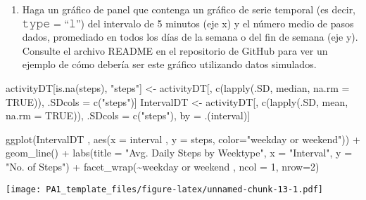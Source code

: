 \documentclass[
]{article}
\newenvironment{Shaded}{\begin{snugshade}}{\end{snugshade}}
\newcommand{\AttributeTok}[1]{\textcolor[rgb]{0.77,0.63,0.00}{#1}}
\newcommand{\ConstantTok}[1]{\textcolor[rgb]{0.00,0.00,0.00}{#1}}
\newcommand{\DecValTok}[1]{\textcolor[rgb]{0.00,0.00,0.81}{#1}}
\newcommand{\FunctionTok}[1]{\textcolor[rgb]{0.00,0.00,0.00}{#1}}
\newcommand{\NormalTok}[1]{#1}
\newcommand{\OtherTok}[1]{\textcolor[rgb]{0.56,0.35,0.01}{#1}}
\newcommand{\SpecialCharTok}[1]{\textcolor[rgb]{0.00,0.00,0.00}{#1}}
\newcommand{\StringTok}[1]{\textcolor[rgb]{0.31,0.60,0.02}{#1}}
\providecommand{\tightlist}{%
  \setlength{\itemsep}{0pt}\setlength{\parskip}{0pt}}
\begin{document}
\begin{enumerate}
\def\labelenumi{\arabic{enumi}.}
\setcounter{enumi}{1}
\tightlist
\item
  Haga un gráfico de panel que contenga un gráfico de serie temporal (es
  decir, 𝚝𝚢𝚙𝚎 = ``𝚕'') del intervalo de 5 minutos (eje x) y el número
  medio de pasos dados, promediado en todos los días de la semana o del
  fin de semana (eje y). Consulte el archivo README en el repositorio de
  GitHub para ver un ejemplo de cómo debería ser este gráfico utilizando
  datos simulados.
\end{enumerate}

\begin{Shaded}
\begin{Highlighting}[]
\NormalTok{activityDT[}\FunctionTok{is.na}\NormalTok{(steps), }\StringTok{"steps"}\NormalTok{] }\OtherTok{\textless{}{-}}\NormalTok{ activityDT[, }\FunctionTok{c}\NormalTok{(}\FunctionTok{lapply}\NormalTok{(.SD, median, }\AttributeTok{na.rm =} \ConstantTok{TRUE}\NormalTok{)), .SDcols }\OtherTok{=} \FunctionTok{c}\NormalTok{(}\StringTok{"steps"}\NormalTok{)]}
\NormalTok{IntervalDT }\OtherTok{\textless{}{-}}\NormalTok{ activityDT[, }\FunctionTok{c}\NormalTok{(}\FunctionTok{lapply}\NormalTok{(.SD, mean, }\AttributeTok{na.rm =} \ConstantTok{TRUE}\NormalTok{)), .SDcols }\OtherTok{=} \FunctionTok{c}\NormalTok{(}\StringTok{"steps"}\NormalTok{), by }\OtherTok{=}\NormalTok{ .(interval)]}

\FunctionTok{ggplot}\NormalTok{(IntervalDT , }\FunctionTok{aes}\NormalTok{(}\AttributeTok{x =}\NormalTok{ interval , }\AttributeTok{y =}\NormalTok{ steps, }\AttributeTok{color=}\StringTok{"weekday or weekend"}\NormalTok{)) }\SpecialCharTok{+} \FunctionTok{geom\_line}\NormalTok{() }\SpecialCharTok{+} \FunctionTok{labs}\NormalTok{(}\AttributeTok{title =} \StringTok{"Avg. Daily Steps by Weektype"}\NormalTok{, }\AttributeTok{x =} \StringTok{"Interval"}\NormalTok{, }\AttributeTok{y =} \StringTok{"No. of Steps"}\NormalTok{) }\SpecialCharTok{+} \FunctionTok{facet\_wrap}\NormalTok{(}\SpecialCharTok{\textasciitilde{}}\StringTok{\textquotesingle{}weekday or weekend\textquotesingle{}}\NormalTok{ , }\AttributeTok{ncol =} \DecValTok{1}\NormalTok{, }\AttributeTok{nrow=}\DecValTok{2}\NormalTok{)}
\end{Highlighting}
\end{Shaded}

\texttt{[image: PA1\_template\_files/figure-latex/unnamed-chunk-13-1.pdf]}
\end{document}
